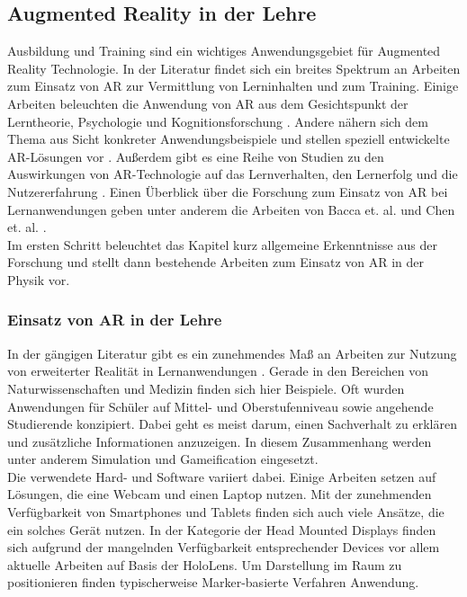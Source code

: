 \subsection{Augmented Reality in der Lehre}
\label{sec-2-2}
Ausbildung und Training sind ein wichtiges Anwendungsgebiet für Augmented Reality Technologie. In der Literatur findet sich ein breites Spektrum an Arbeiten zum Einsatz von AR zur Vermittlung von Lerninhalten und zum Training. Einige Arbeiten beleuchten die Anwendung von AR aus dem Gesichtspunkt der Lerntheorie, Psychologie und Kognitionsforschung \cite{Marichal17, Santos14}. Andere nähern sich dem Thema aus Sicht konkreter Anwendungsbeispiele und stellen speziell entwickelte AR-Lösungen vor \cite{Strzys17, Amiraslanov18, Buchau09, Hughes05}. Außerdem gibt es eine Reihe von Studien zu den Auswirkungen von AR-Technologie auf das Lernverhalten, den Lernerfolg und die Nutzererfahrung \cite{Ibanez14, Li11, Jerry10, Akcayir16, Strzys18}. Einen Überblick über die Forschung zum Einsatz von AR bei Lernanwendungen geben unter anderem die Arbeiten von Bacca et. al. und Chen et. al. \cite{Chen2017, Bacca14}.\\

Im ersten Schritt beleuchtet das Kapitel kurz allgemeine Erkenntnisse aus der Forschung und stellt dann bestehende Arbeiten zum Einsatz von AR in der Physik vor.

\subsubsection{Einsatz von AR in der Lehre}
In der gängigen Literatur gibt es ein zunehmendes Maß an Arbeiten zur Nutzung von erweiterter Realität in Lernanwendungen \cite{Bacca14, Ibanez18}. Gerade in den Bereichen von Naturwissenschaften und Medizin finden sich hier Beispiele. Oft wurden Anwendungen für Schüler auf Mittel- und Oberstufenniveau sowie angehende Studierende konzipiert. Dabei geht es meist darum, einen Sachverhalt zu erklären und zusätzliche Informationen anzuzeigen. In diesem Zusammenhang werden unter anderem Simulation und Gameification eingesetzt.\\

Die verwendete Hard- und Software variiert dabei. Einige Arbeiten setzen auf Lösungen, die eine Webcam und einen Laptop nutzen. Mit der zunehmenden Verfügbarkeit von Smartphones und Tablets finden sich auch viele Ansätze, die ein solches Gerät nutzen. In der Kategorie der Head Mounted Displays finden sich aufgrund der mangelnden Verfügbarkeit entsprechender Devices vor allem aktuelle Arbeiten auf Basis der HoloLens. Um Darstellung im Raum zu positionieren finden typischerweise Marker-basierte Verfahren Anwendung.\\

